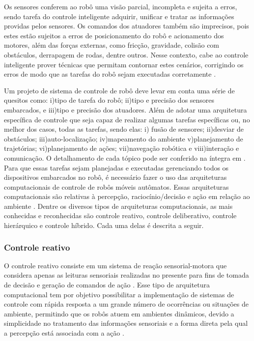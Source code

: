 Os sensores conferem ao robô uma visão parcial, incompleta e sujeita a erros, sendo tarefa do controle inteligente adquirir, unificar e tratar as informações providas pelos sensores. Os comandos dos atuadores também são imprecisos, pois estes estão sujeitos a erros de posicionamento do robô e acionamento dos motores, além das forças externas, como fricção, gravidade, colisão com obstáculos, derrapagem de rodas, dentre outros. Nesse contexto, cabe ao controle inteligente prover técnicas que permitam contornar estes cenários, corrigindo os erros de modo que as tarefas do robô sejam executadas corretamente \cite{wolf2009robotica}.

Um projeto de sistema de controle de robô deve levar em conta uma série de quesitos como: i)tipo de tarefa do robô; ii)tipo e precisão dos sensores embarcados, e iii)tipo e precisão dos atuadores. Além de adotar uma arquitetura específica de controle que seja capaz de realizar algumas tarefas específicas ou, no melhor dos casos, todas as tarefas, sendo elas: i) fusão de sensores; ii)desviar de obstáculos; iii)auto-localização; iv)mapeamento do ambiente v)planejamento de trajetórias; vi)planejamento de ações; vii)navegação robótica e viii)interação e comunicação. O detalhamento de cada tópico pode ser conferido na íntegra em \cite{wolf2009robotica}. 
Para que essas tarefas sejam planejadas e executadas gerenciando todos os dispositivos embarcados no robô, é necessário fazer o uso das arquiteturas computacionais de controle de robôs móveis autômatos. Essas arquiteturas computacionais são relativas à percepção, raciocínio/decisão e ação em relação ao ambiente \cite{wolf2009robotica}. Dentre os diversos tipos de arquiteturas computacionais, as mais conhecidas e reconhecidas são controle reativo, controle deliberativo, controle hierárquico e controle híbrido. Cada uma delas é descrita a seguir.

\subsubsection{Controle reativo}
O controle reativo consiste em um sistema de reação sensorial-motora que considera apenas as leituras sensoriais realizadas no presente para fins de tomada de decisão e geração de comandos de ação \cite{wolf2009robotica}. Esse tipo de arquitetura computacional tem por objetivo possibilitar a implementação de sistemas de controle com rápida resposta a um grande número de ocorrências ou situações de ambiente, permitindo que os robôs atuem em ambientes dinâmicos, devido a simplicidade no tratamento das informações sensoriais e a forma direta pela qual a percepção está associada com a ação . 

